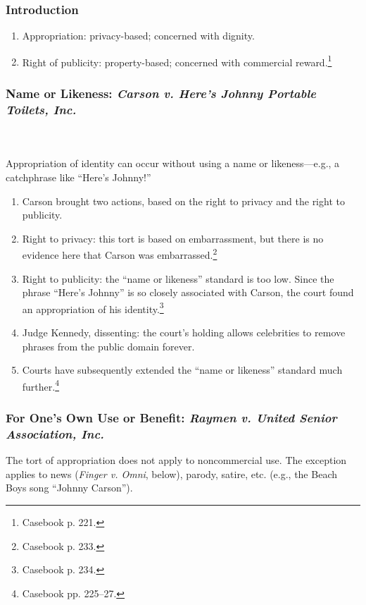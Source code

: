 \subsubsection{Introduction}

\begin{enumerate}
    \item Appropriation: privacy-based; concerned with dignity.
    \item Right of publicity: property-based; concerned with commercial 
    reward.\footnote{Casebook p. 221.}
\end{enumerate}

\subsubsection{Name or Likeness: \emph{Carson v. Here's Johnny Portable Toilets, 
Inc.}}
~\\\\
Appropriation of identity can occur without using a name or likeness---e.g., a 
catchphrase like ``Here's Johnny!''

\begin{enumerate}
    \item Carson brought two actions, based on the right to privacy and the 
    right to publicity.
    \item Right to privacy: this tort is based on embarrassment, but there is no 
    evidence here that Carson was embarrassed.\footnote{Casebook p. 233.}
    \item Right to publicity: the ``name or likeness'' standard is too low.  
    Since the phrase ``Here's Johnny'' is so closely associated with Carson, the 
    court found an appropriation of his identity.\footnote{Casebook p. 234.}
    \item Judge Kennedy, dissenting: the court's holding allows celebrities to 
    remove phrases from the public domain forever.
    \item Courts have subsequently extended the ``name or likeness'' standard 
    much further.\footnote{Casebook pp. 225--27.}
\end{enumerate}

\subsubsection{For One's Own Use or Benefit: \emph{Raymen v. United Senior 
Association, Inc.}}

The tort of appropriation does not apply to noncommercial use. The exception 
applies to news (\emph{Finger v. Omni}, below), parody, satire, etc. (e.g., the 
Beach Boys song ``Johnny Carson'').

